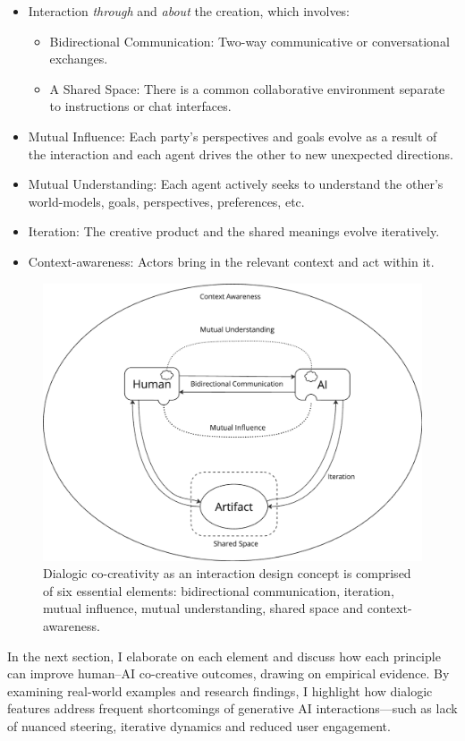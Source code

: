     \begin{itemize}
        \item Interaction \textit{through} and \textit{about} the creation, which involves: 
        \begin{itemize}
            \item Bidirectional Communication: Two-way communicative or conversational exchanges.
            \item A Shared Space: There is a common collaborative environment separate to instructions or chat interfaces.
        \end{itemize}
        \item Mutual Influence: Each party’s perspectives and goals evolve as a result of the interaction and each agent drives the other to new unexpected directions.
        \item Mutual Understanding: Each agent actively seeks to understand the other's world-models, goals, perspectives, preferences, etc.
        \item Iteration: The creative product and the shared meanings evolve iteratively.
        \item Context-awareness: Actors bring in the relevant context and act within it.
    \end{itemize}


    \begin{figure}
    \centering
    \includegraphics[width=0.75\linewidth]{dialogicelements.png}
    \caption{Dialogic co-creativity as an interaction design concept is comprised of six
essential elements: bidirectional communication, iteration, mutual influence, mutual understanding, shared space and context-awareness. }
    \label{fig:enter-label}
\end{figure}


In the next section, I elaborate on each element and discuss how each principle can improve human–AI co-creative outcomes, drawing on empirical evidence. By examining real-world examples and research findings, I highlight how dialogic features address frequent shortcomings of generative AI interactions—such as lack of nuanced steering, iterative dynamics and reduced user engagement.

